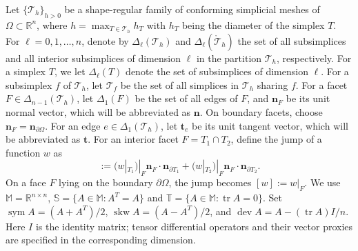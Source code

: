 \documentclass[10pt]{amsart}
\numberwithin{equation}{section}
\newcommand{\curl}{\operatorname{curl}}
\renewcommand{\div}{\operatorname{div}}
\newcommand{\tr}{\operatorname{tr}}
\newcommand{\dev}{\operatorname{dev}}
\newcommand{\sym}{\operatorname{sym}}
\newcommand{\skw}{\operatorname{skw}}
\begin{document}
Let $\{\mathcal{T}_{h}\}_{h>0}$ be a shape-regular family of conforming simplicial meshes of $\Omega\subset \mathbb{R}^{n}$, where $h=\max_{T\in\mathcal{T}_{h}}h_T$ with $h_T$ being the diameter of the simplex $T$. For $\ell=0,1,\ldots,n$,
denote by $\Delta_{\ell}(\mathcal T_h)$ and $\Delta_{\ell}(\mathring{\mathcal T}_h)$ the set of all subsimplices and all interior subsimplices of dimension $\ell$ in the partition $\mathcal{T}_{h}$, respectively. For a simplex $T$, we let $\Delta_{\ell}(T)$ denote the set of subsimplices of dimension $\ell$. %
For a subsimplex $f$ of $\mathcal{T}_{h}$, let $\mathcal T_f$ be the set of all simplices in $\mathcal{T}_h$ sharing $f$.
For a facet $F\in \Delta_{n-1}(\mathcal T_h)$, let $\Delta_{1}(F)$ be the set of all edges of $F$, and $\boldsymbol{n}_F$ be its unit normal vector, which will be abbreviated as $\boldsymbol{n}$.
On boundary facets, choose $\boldsymbol{n}_F=\boldsymbol{n}_{\partial\Omega}$.
For an edge $e\in \Delta_{1}(\mathcal T_h)$, let $\boldsymbol{t}_e$ be its unit tangent vector, which will be abbreviated as $\boldsymbol{t}$. 
For an interior facet $F=T_1\cap T_2$, define the jump of a function $w$ as
\begin{equation*}
[w]:=(w|_{T_1})|_F\boldsymbol{n}_F\cdot\boldsymbol{n}_{\partial T_1}+(w|_{T_2})|_F\boldsymbol{n}_F\cdot\boldsymbol{n}_{\partial T_2}.
\end{equation*}
On a face $F$ lying on the boundary $\partial\Omega$, the jump becomes $[w]:=w|_F$.
We use $\mathbb M=\mathbb R^{n\times n}$, $\mathbb S=\{A\in\mathbb M:A^T=A\}$ and $\mathbb T=\{A\in\mathbb M:\tr A=0\}$.
Set $\sym A=(A+A^T)/2$, $\skw A=(A-A^T)/2$, and $\dev A=A-(\tr A)I/n$.
Here $I$ is the identity matrix; tensor differential operators and their vector proxies are specified in the corresponding dimension.
\end{document}
